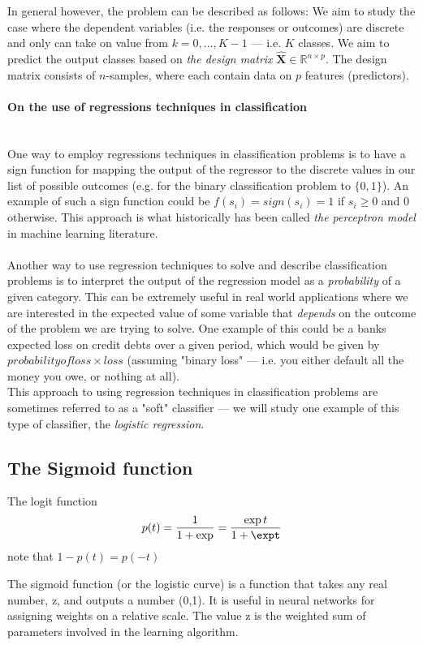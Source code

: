 \documentclass[10pt, a4paper, twocolumn]{article}
\newcommand{\myparagraph}[1]{\paragraph{#1}\mbox{}\\}
\begin{document}
		In general however, the problem can be described as follows: We aim to study the case where the dependent variables (i.e. the responses or outcomes) are discrete and only can take on value from $k = 0,\dots,K-1$ --- i.e. $K$ classes. We aim to predict the output classes based on \emph{the design matrix} $\mathbf{\hat{X}} \in \mathbb{R}^{n\times p}$. The design matrix consists of $n$-samples, where each contain data on $p$ features (predictors).
		
	\myparagraph{On the use of regressions techniques in classification}
		One way to employ regressions techniques in classification problems is to have a sign function for mapping the output of the regressor to the discrete values in our list of possible outcomes (e.g. for the binary classification problem to $\{0,1\}$). An example of such a sign function could be $f(s_i)=sign(s_i)=1$ if $s_i\geq 0$ and $0$ otherwise. This approach is what historically has been called \emph{the perceptron model} in machine learning literature.\\\\
		
		Another way to use regression techniques to solve and describe classification problems is to interpret the output of the regression model as a \emph{probability} of a given category. This can be extremely useful in real world applications where we are interested in the expected value of some variable that \emph{depends} on the outcome of the problem we are trying to solve. One example of this could be a banks expected loss on credit debts over a given period, which would be given by $\mathit{probability of loss}\times\mathit{loss}$ (assuming "binary loss" --- i.e. you either default all the money you owe, or nothing at all).\\
		This approach to using regression techniques in classification problems are sometimes referred to as a "soft" classifier --- we will study one example of this type of classifier, the \emph{logistic regression}. 
		
	\subsection{The Sigmoid function}
		The logit function
			$$p(t) = \frac{1}{1+\exp}=\frac{\exp t}{1+\expt}$$
		note that $1-p(t)=p(-t)$
		
		The sigmoid function (or the logistic curve) is a
		function that takes any real number, z, and outputs a number (0,1).
		It is useful in neural networks for assigning weights on a relative scale.
		The value z is the weighted sum of parameters involved in the learning algorithm.
\end{document}
